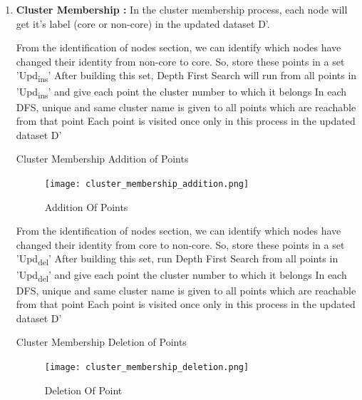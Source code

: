 \documentclass[acmsmall]{acmart}
\begin{document}
\begin{enumerate}
\item \textbf{Cluster Membership :}
In the cluster membership process, each node will get it's label (core or non-core) in the updated dataset D'.
\begin{algorithm}
    \SetAlgoLined
    From the identification of nodes section, we can identify which nodes have changed their identity from non-core to core. So, store these points in a set 'Upd\textsubscript{ins}'\;
    After building this set, Depth First Search will run from all points in 'Upd\textsubscript{ins}' and give each point the cluster number to which it belongs\;
    In each DFS, unique and same cluster name is given to all points which are reachable from that point\;
    Each point is visited once only in this process in the updated dataset D'\;
    \caption{Cluster Membership Addition of Points}
\end{algorithm}
\begin{figure}[H]
    \centering
    \texttt{[image: cluster\_membership\_addition.png]}
    \caption{Addition Of Points}
    \label{fig:my_label}
\end{figure} 
\begin{algorithm}
    From the identification of nodes section, we can identify which nodes have changed their identity from core to non-core. So, store these points in a set 'Upd\textsubscript{del}'\;
    After building this set, run Depth First Search from all points in 'Upd\textsubscript{del}' and give each point the cluster number to which it belongs\;
    In each DFS, unique and same cluster name is given to all points which are reachable from that point\;
    Each point is visited once only in this process in the updated dataset D'\;
    \caption{Cluster Membership Deletion of Points}
\end{algorithm}

\begin{figure}[H]
    \centering
    \texttt{[image: cluster\_membership\_deletion.png]}
    \caption{Deletion Of Point}
    \label{fig:my_label}
\end{figure}
\end{enumerate}
\end{document}
